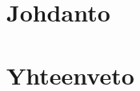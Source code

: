 \documentclass[finnish, numeric, draft]{tauthesis}
\begin{document}

\tableofcontents





\glossary


\mainmatter


\chapter{Johdanto}
\label{ch:johdanto}


\chapter{Yhteenveto}
\label{ch:yhteenveto}



\printbibliography[heading=bibintoc]



\end{document}
